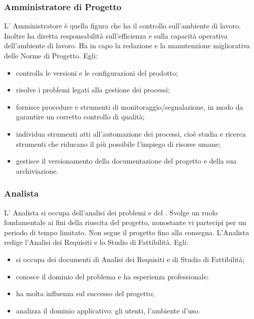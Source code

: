 \subsubsection{Amministratore di Progetto}
L’ Amministratore è quella figura che ha il controllo sull'ambiente di lavoro. Inoltre ha diretta responsabilità sull'efficienza e sulla capacità operativa dell'ambiente di lavoro.
Ha in capo la redazione e la manutenzione migliorativa delle Norme di Progetto.
Egli:
\begin{itemize}
\item{controlla le versioni e le configurazioni del prodotto;}
\item{risolve i problemi legati alla gestione dei processi;}
\item{fornisce procedure e strumenti di monitoraggio/segnalazione, in modo da garantire un corretto controllo di qualità;}
\item{individua strumenti atti all’automazione dei processi, cioè studia e ricerca strumenti che riducano il più possibile l'impiego di risorse umane;}
\item{gestisce il versionamento della documentazione del progetto e della sua archiviazione.}
\end{itemize}


\subsubsection{Analista}
L’ Analista si occupa dell’analisi dei problemi e del . Svolge un ruolo fondamentale ai fini della riuscita del progetto, nonostante vi partecipi per un periodo di tempo limitato. Non segue il progetto fino alla consegna.
L'Analista redige l'Analisi dei Requisiti e lo Studio di Fattibilità.
Egli:
\begin{itemize}
\item{si occupa dei documenti di Analisi dei Requisiti e di Studio di Fattibilità;}
\item{conosce il dominio del problema e ha esperienza professionale;}
\item{ha molta influenza sul successo del progetto;}
\item{analizza il dominio applicativo:  gli utenti, l’ambiente d’uso.}
\end{itemize}


